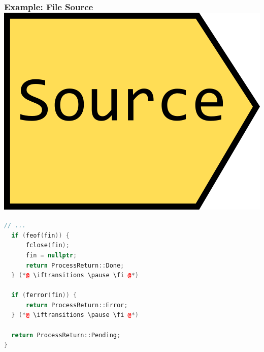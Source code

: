 \documentclass[aspectratio=169]{beamer}
\newif\iftransitions
\begin{document}
\begin{frame}[fragile]
  \frametitle{Example: File Source \hspace{250pt} \includegraphics[height=.1\textheight]{pipelinesgfx/source.png}}
  \begin{lstlisting}[language={C++}]
  // ...
  if (feof(fin)) {
      fclose(fin);
      fin = nullptr;
      return ProcessReturn::Done;
  } (*@ \iftransitions \pause \fi @*)
  
  if (ferror(fin)) {
      return ProcessReturn::Error;
  } (*@ \iftransitions \pause \fi @*)
  
  return ProcessReturn::Pending;
}
  \end{lstlisting}
\end{frame}
\end{document}
